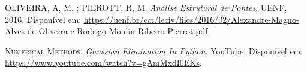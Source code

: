 \documentclass{article}
\begin{document}
\begin{thebibliography}{9}
OLIVEIRA, A, M. ; PIEROTT, R, M.
\textit{Análise Estrutural de Pontes}. 
UENF, 2016. Disponível em: \url{https://uenf.br/cct/leciv/files/2016/02/Alexandre-Magno-Alves-de-Oliveira-e-Rodrigo-Moulin-Ribeiro-Pierrot.pdf}

\textsc{Numerical Methods}. \textit{Gaussian Elimination In Python}. YouTube, Disponível em: \url{https://www.youtube.com/watch?v=gAmMxdI0EKs}.

\end{thebibliography}
\end{document}
